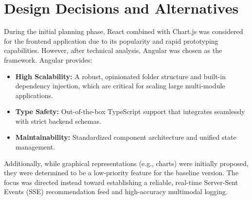 \documentclass[12pt,a4paper,oneside]{report}
\begin{document}
\section{Design Decisions and Alternatives}
During the initial planning phase, React combined with Chart.js was considered for the frontend application due to its popularity and rapid prototyping capabilities. However, after technical analysis, Angular was chosen as the framework. Angular provides:
\begin{itemize}
    \item \textbf{High Scalability:} A robust, opinionated folder structure and built-in dependency injection, which are critical for scaling large multi-module applications.
    \item \textbf{Type Safety:} Out-of-the-box TypeScript support that integrates seamlessly with strict backend schemas.
    \item \textbf{Maintainability:} Standardized component architecture and unified state management.
\end{itemize}
Additionally, while graphical representations (e.g., charts) were initially proposed, they were determined to be a low-priority feature for the baseline version. The focus was directed instead toward establishing a reliable, real-time Server-Sent Events (SSE) recommendation feed and high-accuracy multimodal logging.
\end{document}
